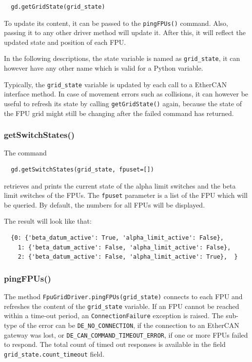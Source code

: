 \documentclass[11pt,a4paper]{report}
\begin{document}
\begin{verbatim}
  gd.getGridState(grid_state)
\end{verbatim}

To update its content, it can be passed to the \texttt{pingFPUs()}
command. Also, passing it to any other driver method will update
it. After this, it will reflect the updated state and position of each
FPU.

In the following descriptions, the state variable is named as
\texttt{grid\_state}, it can however have any other name which is
valid for a Python variable.

Typically, the \texttt{grid\_state} variable is updated by each call
to a EtherCAN interface method. In case of movement errors such as collisions, it
can however be useful to refresh its state by calling
\texttt{getGridState()} again, because the state of the FPU grid might
still be changing after the failed command has returned.

\subsubsection{getSwitchStates()}

The command
\begin{verbatim}
  gd.getSwitchStates(grid_state, fpuset=[])
\end{verbatim}
retrieves and prints the current state of the alpha limit switches
and the beta limit switches of the FPUs.  The \texttt{fpuset}
parameter is a list of the FPU which will be queried. By default, the
numbers for all FPUs will be displayed.

The result will look like that:
\begin{verbatim}
  {0: {'beta_datum_active': True, 'alpha_limit_active': False},
    1: {'beta_datum_active': False, 'alpha_limit_active': False},
    2: {'beta_datum_active': False, 'alpha_limit_active': True},  }
\end{verbatim}




\subsubsection{pingFPUs()}
\begin{sloppypar}
  The method
\texttt{FpuGridDriver.pingFPUs(grid\_state)} connects to each FPU and
refreshes the content of the \texttt{grid\_state} variable. If an FPU
cannot be reached within a time-out period, an
\texttt{ConnectionFailure} exception is raised. The sub-type of the
error can be \texttt{DE\_NO\_CONNECTION}, if the connection to an
EtherCAN gateway was lost, or
\texttt{DE\_CAN\_COMMAND\_TIMEOUT\_ERROR}, if one or more FPUs failed
to respond. The total count of timed out responses is available in the
field \texttt{grid\_state.count\_timeout} field.
\end{sloppypar}
\end{document}
